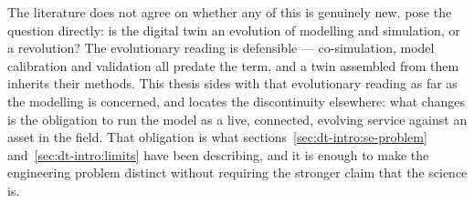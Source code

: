 The literature does not agree on whether any of this is genuinely new.
\citet{ali_modeling_2024} pose the question directly: is the digital twin an
evolution of modelling and simulation, or a revolution? The evolutionary
reading is defensible --- co-simulation, model calibration and validation all
predate the term, and a twin assembled from them inherits their methods. This
thesis sides with that evolutionary reading as far as the modelling is
concerned, and locates the discontinuity elsewhere: what changes is the
obligation to run the model as a live, connected, evolving service against an
asset in the field. That obligation is what
sections~\ref{sec:dt-intro:se-problem} and~\ref{sec:dt-intro:limits} have
been describing, and it is enough to make the engineering problem distinct
without requiring the stronger claim that the science is.
